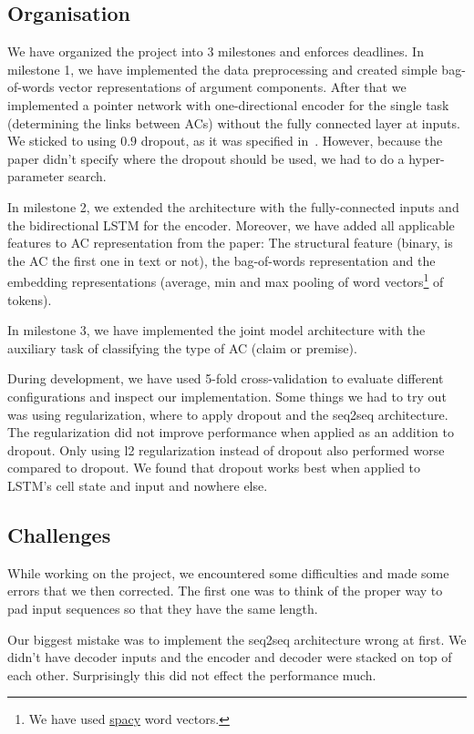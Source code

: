 \documentclass[onecolumn]{article}
\begin{document}
\subsection{Organisation}
We have organized the project into 3 milestones and enforces deadlines.
In milestone 1, we have implemented the data preprocessing and created simple bag-of-words vector representations of argument components.
After that we implemented a pointer network with one-directional encoder for the single task (determining the links between ACs) without the fully connected layer at inputs.
We sticked to using $0.9$ dropout, as it was specified in~\cite{potash2017here}.
However, because the paper didn't specify where the dropout should be used, we had to do a hyper-parameter search.

In milestone 2, we extended the architecture with the fully-connected inputs and the bidirectional LSTM for the encoder.
Moreover, we have added all applicable features to AC representation from the paper: The structural feature
(binary, is the AC the first one in text or not), the bag-of-words representation and the embedding representations (average, min and max pooling
of word vectors\footnote{We have used \href{https://github.com/explosion/spacy-models/releases/tag/en_vectors_web_lg-2.0.0}{spacy} word vectors.} of tokens).

In milestone 3, we have implemented the joint model architecture with the auxiliary task of classifying the type of AC (claim or premise).

During development, we have used 5-fold cross-validation to evaluate different configurations and inspect our implementation.
Some things we had to try out was using regularization, where to apply dropout and the seq2seq architecture.
The regularization did not improve performance when applied as an addition to dropout.
Only using l2 regularization instead of dropout also performed worse compared to dropout.
We found that dropout works best when applied to LSTM's cell state and input and nowhere else.

\subsection{Challenges}
While working on the project, we encountered some difficulties and made some errors that we then corrected. The first one
was to think of the proper way to pad input sequences so that they have the same length.

Our biggest mistake was to implement the seq2seq architecture wrong at first. We didn't have decoder inputs and the encoder and decoder were stacked on top of each other. Surprisingly this did not effect the performance much.
\end{document}
